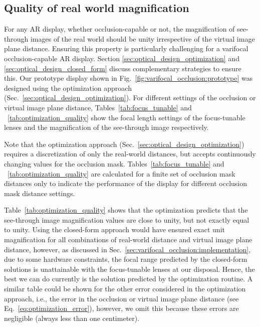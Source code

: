 \subsection{Quality of real world magnification}
\label{sec:results_optimization_quality}
For any AR display, whether occlusion-capable or not, the magnification of see-through images of the real world should be unity irrespective of the virtual image plane distance. Ensuring this property is particularly challenging for a varifocal occlusion-capable AR display. Section \ref{sec:optical_design_optimization} and \ref{sec:optical_design_closed_form} discuss complementary strategies to ensure this. Our prototype display shown in Fig.~\ref{fig:varifocal_occlusion:prototype} was designed using the optimization approach (Sec.~\ref{sec:optical_design_optimization}). For different settings of the occlusion or virtual image plane distance, Tables~\ref{tab:focus_tunable} and ~\ref{tab:optimization_quality} show the focal length settings of the focus-tunable lenses and the magnification of the see-through image respectively. 

Note that the optimization approach (Sec.~\ref{sec:optical_design_optimization}) requires a discretization of only the real-world distances, but accepts continuously changing values for the occlusion mask. Tables~\ref{tab:focus_tunable} and ~\ref{tab:optimization_quality} are calculated for a finite set of occlusion mask distances only to indicate the performance of the display for different occlusion mask distance settings.

Table~\ref{tab:optimization_quality} shows that the optimization predicts that the see-through image magnification values are close to unity, but not exactly equal to unity. Using the closed-form approach would have ensured exact unit magnification for all combinations of real-world distance and virtual image plane distance, however, as discussed in Sec.~\ref{sec:varifocal_occlusion:implementation}, due to some hardware constraints, the focal range predicted by the closed-form solutions is unattainable with the focus-tunable lenses at our disposal. Hence, the best we can do currently is the solution predicted by the optimization routine. A similar table could be shown for the other error considered in the optimization approach, i.e., the error in the occlusion or virtual image plane distance (see Eq.~\ref{eq:optimization_error}), however, we omit this because these errors are negligible (always less than one centimeter). 

